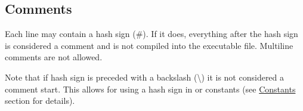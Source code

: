 \hypertarget{comments} {
    \subsection{Comments}
}

Each line may contain a hash sign (\#).
If it does, everything after the hash sign is considered a comment and
is not compiled into the executable file.
Multiline comments are not allowed.

Note that if hash sign is preceded with a backslash (\textbackslash)
it is not considered a comment start.
This allows for using a hash sign in  or  constants
(see \hyperlink{constants}{Constants} section for details).

